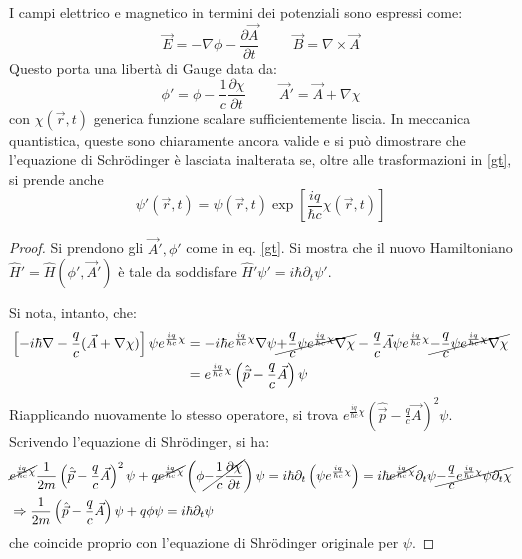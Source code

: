 \documentclass[11pt, a4paper]{scrartcl} %
\numberwithin{equation}{subsection}
\theoremstyle{style2}
\theoremstyle{style1}
\begin{document}
I campi elettrico e magnetico in termini dei potenziali sono espressi come:
\begin{equation}
	\vec{E} = - \nabla \phi - \frac{\partial \vec{A}}{\partial t} \hspace{1cm} \vec{B} = \nabla \times \vec{A}
\end{equation}
Questo porta una libert\`a di Gauge data da:
\begin{equation}\label{gt}
		\phi ' = \phi - \frac{1}{c}\frac{\partial \chi }{\partial t} \hspace{1cm} \vec{A}' = \vec{A} + \nabla \chi 
\end{equation}
con $\chi (\vec{r},t)$ generica funzione scalare sufficientemente liscia.
In meccanica quantistica, queste sono chiaramente ancora valide e si pu\`o dimostrare che l'equazione di Schr\"odinger \`e lasciata inalterata se, oltre alle trasformazioni in \ref{gt}, si prende anche
\begin{equation}
	\psi '(\vec{r},t) = \psi(\vec{r},t) \exp \left[ \frac{iq}{\hbar c }\chi (\vec{r},t) \right] 
\end{equation}
\begin{proof}
	Si prendono gli $\vec{A}', \phi '$ come in eq. \ref{gt}. 
	Si mostra che il nuovo Hamiltoniano $\hat{H}' = \hat{H}(\phi ', \vec{A}')$ \`e tale da soddisfare $\hat{H}' \psi ' = i\hbar \partial _t \psi '$.

	Si nota, intanto, che:
	\[
		\begin{split}
			\left[- i \hbar \nabla  -\frac{q}{c}(\vec{A}+ \nabla \chi )\right] \psi e^{\frac{iq}{\hbar c}\chi } &= -i \hbar e^{\frac{iq}{\hbar c}\chi } \nabla \psi \cancel{+ \frac{q}{c} \psi e^{\frac{iq}{\hbar c}\chi } \nabla \chi }- \frac{q}{c}\vec{A} \psi e^{\frac{iq}{\hbar c}\chi } \cancel{- \frac{q}{c} \psi e^{\frac{iq }{\hbar c}\chi } \nabla \chi }\\
															    & = e^{\frac{iq}{\hbar c}\chi }\left(\hat{\vec{p}}- \frac{q}{c}\vec{A}\right)  \psi 
		\end{split}
	\] 
Riapplicando nuovamente lo stesso operatore, si trova $e^{\frac{iq}{\hbar c}\chi } \left(\hat{\vec{p}}-\frac{q}{c}\vec{A}\right) ^2 \psi $. 
Scrivendo l'equazione di Shr\"odinger, si ha:
\[
	\begin{split}
		&\cancel{e^{\frac{iq}{\hbar c}\chi }}\frac{1}{2m} \left(\hat{\vec{p}}- \frac{q}{c}\vec{A}\right)^2 \psi + q \cancel{e^{\frac{iq}{\hbar c}\chi } }\left(\phi \cancel{- \frac{1}{c}\frac{\partial \chi }{\partial t}} \right) \psi   = i\hbar \partial _t \left(\psi e^{\frac{iq}{\hbar c}\chi }   \right) =i \hbar \cancel{e^{\frac{iq}{\hbar c}\chi }} \partial _t \psi \cancel{- \frac{q}{c} e^{\frac{iq}{\hbar c}\chi } \psi  \partial _t \chi }\\
		&\Rightarrow \frac{1}{2m}\left(\hat{\vec{p}}-\frac{q}{c}\vec{A}\right) \psi  + q\phi \psi = i\hbar \partial _t \psi 
	\end{split}
\] 
che coincide proprio con l'equazione di Shr\"odinger originale per $\psi $.
\end{proof}
\end{document}
